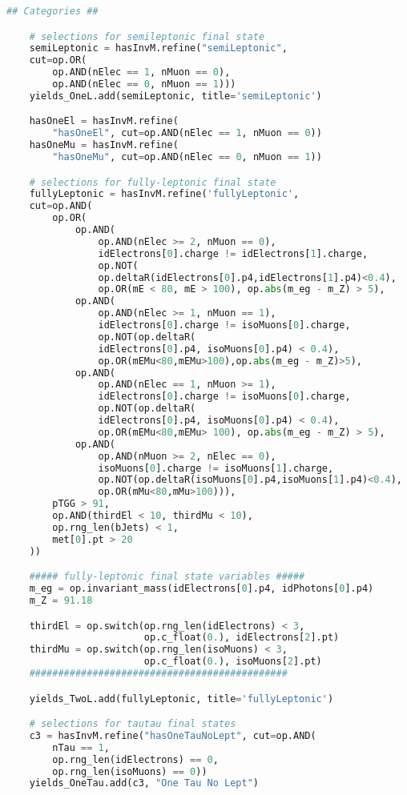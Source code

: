 \begin{lstlisting}[language=Python, caption=Python module of the analysis used in Bamboo framework, label={bamboocode}]
    ## Categories ##

    # selections for semileptonic final state
    semiLeptonic = hasInvM.refine("semiLeptonic",
    cut=op.OR(
        op.AND(nElec == 1, nMuon == 0),
        op.AND(nElec == 0, nMuon == 1)))
    yields_OneL.add(semiLeptonic, title='semiLeptonic')

    hasOneEl = hasInvM.refine(
        "hasOneEl", cut=op.AND(nElec == 1, nMuon == 0))
    hasOneMu = hasInvM.refine(
        "hasOneMu", cut=op.AND(nElec == 0, nMuon == 1))

    # selections for fully-leptonic final state
    fullyLeptonic = hasInvM.refine('fullyLeptonic',
    cut=op.AND(
        op.OR(
            op.AND(
                op.AND(nElec >= 2, nMuon == 0),
                idElectrons[0].charge != idElectrons[1].charge,
                op.NOT(
                op.deltaR(idElectrons[0].p4,idElectrons[1].p4)<0.4),
                op.OR(mE < 80, mE > 100), op.abs(m_eg - m_Z) > 5),
            op.AND(
                op.AND(nElec >= 1, nMuon == 1),
                idElectrons[0].charge != isoMuons[0].charge,
                op.NOT(op.deltaR(
                idElectrons[0].p4, isoMuons[0].p4) < 0.4),
                op.OR(mEMu<80,mEMu>100),op.abs(m_eg - m_Z)>5),
            op.AND(
                op.AND(nElec == 1, nMuon >= 1),
                idElectrons[0].charge != isoMuons[0].charge,
                op.NOT(op.deltaR(
                idElectrons[0].p4, isoMuons[0].p4) < 0.4),
                op.OR(mEMu<80,mEMu> 100), op.abs(m_eg - m_Z) > 5),
            op.AND(
                op.AND(nMuon >= 2, nElec == 0),
                isoMuons[0].charge != isoMuons[1].charge,
                op.NOT(op.deltaR(isoMuons[0].p4,isoMuons[1].p4)<0.4),
                op.OR(mMu<80,mMu>100))),
        pTGG > 91,
        op.AND(thirdEl < 10, thirdMu < 10),
        op.rng_len(bJets) < 1,
        met[0].pt > 20
    ))

    ##### fully-leptonic final state variables #####
    m_eg = op.invariant_mass(idElectrons[0].p4, idPhotons[0].p4)
    m_Z = 91.18

    thirdEl = op.switch(op.rng_len(idElectrons) < 3,
                        op.c_float(0.), idElectrons[2].pt)
    thirdMu = op.switch(op.rng_len(isoMuons) < 3,
                        op.c_float(0.), isoMuons[2].pt)
    #############################################

    yields_TwoL.add(fullyLeptonic, title='fullyLeptonic')

    # selections for tautau final states
    c3 = hasInvM.refine("hasOneTauNoLept", cut=op.AND(
        nTau == 1,
        op.rng_len(idElectrons) == 0,
        op.rng_len(isoMuons) == 0))
    yields_OneTau.add(c3, "One Tau No Lept")


\end{lstlisting}
